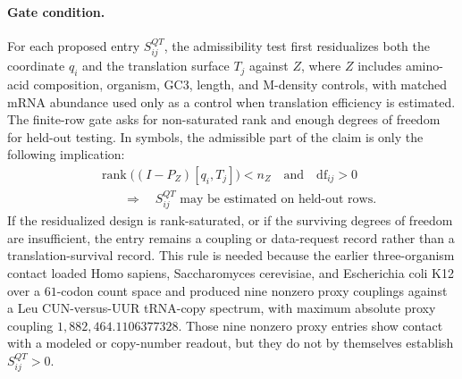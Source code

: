\paragraph{Gate condition.}
For each proposed entry $S^{QT}_{ij}$, the admissibility test first residualizes both the coordinate $q_i$ and the translation surface $T_j$ against $Z$, where $Z$ includes amino-acid composition, organism, GC3, length, and M-density controls, with matched mRNA abundance used only as a control when translation efficiency is estimated.  The finite-row gate asks for non-saturated rank and enough degrees of freedom for held-out testing.  In symbols, the admissible part of the claim is only the following implication:
$$
\begin{aligned}
&\operatorname{rank}\bigl((I-P_Z)[q_i,T_j]\bigr)<n_Z
\quad\text{and}\quad
\mathrm{df}_{ij}>0 \\
&\hspace{2em}\Longrightarrow\quad
S^{QT}_{ij}\text{ may be estimated on held-out rows.}
\end{aligned}
$$
If the residualized design is rank-saturated, or if the surviving degrees of freedom are insufficient, the entry remains a coupling or data-request record rather than a translation-survival record.  This rule is needed because the earlier three-organism contact loaded Homo sapiens, Saccharomyces cerevisiae, and Escherichia coli K12 over a $61$-codon count space and produced nine nonzero proxy couplings against a Leu CUN-versus-UUR tRNA-copy spectrum, with maximum absolute proxy coupling $1{,}882{,}464.1106377328$.  Those nine nonzero proxy entries show contact with a modeled or copy-number readout, but they do not by themselves establish $S^{QT}_{ij}>0$.

